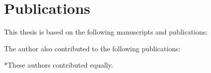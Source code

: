 \chapter*{Publications}

This thesis is based on the following manuscripts and publications:


\nocite{braemerPairLocalizationDipolar2022, franzObservationAnisotropyindependentMagnetization2024, franzEmergentPairLocalization2022,braemerClusterTruncatedWigner2024,eulerMetronomeSpinStabilizes2024} %
\printbibliography[heading=none, keyword={thesis-main}]
The author also contributed to the following publications:

\nocite{geierTimereversalDipolarQuantum2024,muellenbachOTOC,erpeldingSymmetries} 
\printbibliography[heading=none, keyword={thesis-additional}]

*These authors contributed equally.


%

